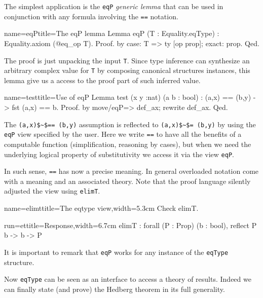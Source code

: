 The simplest application is the \lstinline/eqP/ \emph{generic lemma}
that can be used in conjunction with any formula involving the
\lstinline/==/ notation.

\begin{coq}{name=eqP}{title=The eqP lemma}
Lemma eqP (T : Equality.eqType) : Equality.axiom (@eq_op T).
Proof. by case: T => ty [op prop]; exact: prop. Qed.
\end{coq}

The proof is just unpacking the input \lstinline/T/.
Since type inference can synthesize
an arbitrary complex value for \lstinline/T/ by composing
canonical structures instances, this lemma give us a
access to the proof part of such inferred value.

\begin{coq}{name=test}{title=Use of eqP}
Lemma test (x y :nat) (a b : bool) : (a,x) == (b,y) -> fst (a,x) == b.
Proof. by move/eqP=> def_ax; rewrite def_ax. Qed.
\end{coq}

The \lstinline/(a,x)$~$== (b,y)/ assumption is reflected to
\lstinline/(a,x)$~$= (b,y)/ by using the \lstinline/eqP/ view
specified by the user.  Here we write \lstinline/==/ to have
all the benefits of a computable function (simplification, reasoning
by cases), but when we need the underlying logical property of
substitutivity we access it via the view \lstinline/eqP/.

In such sense,
\lstinline/==/ has now a precise meaning.  In general overloaded
notation come with a meaning and an associated theory.
Note that the proof language silently adjusted the view
using \lstinline/elimT/.

\begin{coq}{name=elimt}{title=The eqtype view,width=5.3cm}
Check elimT.

\end{coq}
\begin{coqout}{run=et}{title=Response,width=6.7cm}
elimT : forall (P : Prop) (b : bool),
          reflect P b -> b -> P
\end{coqout}

It is important to remark that \lstinline/eqP/ works for any
instance of the \lstinline/eqType/ structure.

Now \lstinline/eqType/ can be seen as an interface to access a
theory of results.  Indeed we can finally state (and prove) the
Hedberg theorem in its full generality.


